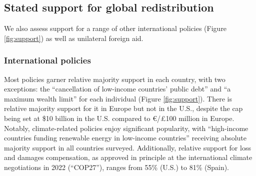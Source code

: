 
\subsection{Stated support for global redistribution}\label{subsec:support_other}


We also assess support for a range of other international policies (Figure \ref{fig:support}) as well as unilateral foreign aid. %


\subsubsection{International policies}\label{subsubsec:support_other_global_policies} %

Most policies garner relative majority support in each country, with two exceptions: the ``cancellation of low-income countries' public debt'' and ``a maximum wealth limit'' for each individual (Figure \ref{fig:support}). %
There is relative majority support for it in Europe but not in the U.S., despite the cap being set at \$10 billion in the U.S. compared to \euro{}/£100 million in Europe. Notably, climate-related policies enjoy significant popularity, with ``high-income countries funding renewable energy in low-income countries'' receiving absolute majority support in all countries surveyed. Additionally, relative support for loss and damages compensation, as approved in principle at the international climate negotiations in 2022 (``COP27''), ranges from 55\% (U.S.) to 81\% (Spain). %


